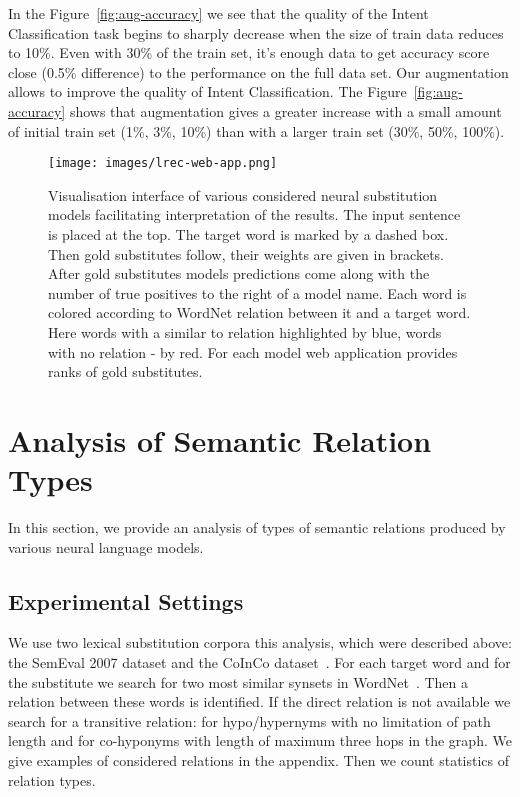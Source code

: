 \documentclass[11pt,a4paper]{article}
\begin{document}
In the Figure~\ref{fig:aug-accuracy} we see that the quality of the Intent Classification task begins to sharply decrease when the size of train data reduces to 10\%. Even with 30\% of the train set, it’s enough data to get accuracy score close (0.5\% difference) to the performance on the full data set. Our augmentation allows to improve the quality of Intent Classification. The Figure~\ref{fig:aug-accuracy} shows that augmentation gives a greater increase with a small amount of initial train set (1\%, 3\%, 10\%) than with a larger train set (30\%, 50\%, 100\%).


\begin{figure*}[!h]
\centering
\texttt{[image: images/lrec-web-app.png]}
\caption{Visualisation  interface of various considered neural substitution models facilitating interpretation of the results. The input sentence is placed at the top. The target word is marked by a dashed box. Then gold substitutes follow, their weights are given in brackets. After gold substitutes models predictions come along with the number of true positives to the right of a model name. Each word is colored according to WordNet relation between it and a target word. Here words with a similar to relation highlighted by blue, words with no relation - by red. For each model web application provides ranks of gold substitutes.}
\label{fig:interface}
\end{figure*}


\section{Analysis of Semantic Relation Types}


In this section, we provide an analysis of types of semantic relations produced by various neural language models.

\subsection{Experimental Settings}
We use two lexical substitution corpora this analysis, which were described above: the SemEval 2007 dataset \cite{mccarthy-navigli-2007-semeval} and the CoInCo dataset~\cite{kremer-etal-2014-substitutes}. For each target word and for the substitute we search for two most similar synsets in WordNet~\cite{miller1995wordnet}. Then a relation between these words is identified. If the direct relation is not available we search for a transitive relation: for hypo/hypernyms with no limitation of path length and for co-hyponyms with length of maximum three hops in the graph. We give examples of considered relations in the appendix. Then we count statistics of  relation types. 
\end{document}
